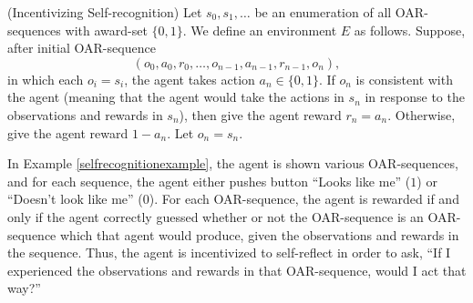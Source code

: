 \documentclass[runningheads]{llncs}
\begin{document}
\begin{example}
\label{selfrecognitionexample}
    (Incentivizing Self-recognition)
    Let $s_0,s_1,\ldots$ be an enumeration of all OAR-sequences with award-set
    $\{0,1\}$. We define an environment $E$ as follows.
    Suppose, after initial OAR-sequence
    \[(o_0,a_0,r_0,\ldots,o_{n-1},a_{n-1},r_{n-1},o_n),\]
    in which each $o_i=s_i$,
    the agent takes action $a_n\in\{0,1\}$. If $o_n$ is consistent with the agent
    (meaning that the agent would take the actions in $s_n$ in response to the observations
    and rewards in $s_n$), then give the agent reward $r_n=a_n$.
    Otherwise, give the agent reward $1-a_n$. Let $o_n=s_n$.
\end{example}

In Example \ref{selfrecognitionexample}, the agent is shown various OAR-sequences, and for
each sequence, the agent either pushes button ``Looks like me'' ($1$)
or ``Doesn't look like me'' ($0$). For each OAR-sequence, the agent is rewarded if and
only if the agent correctly guessed whether or not the OAR-sequence is an OAR-sequence
which that agent would produce, given the observations and rewards in the sequence.
Thus, the agent is incentivized to self-reflect in order to ask, ``If I experienced the
observations and rewards in that OAR-sequence, would I act that way?''
\end{document}
